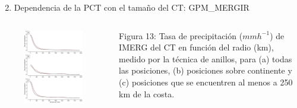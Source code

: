 \begin{frame}
\begin{enumerate}
\setcounter{enumi}{1}
    \item Dependencia de la PCT con el tamaño del CT: GPM\_MERGIR
\end{enumerate}
    \begin{columns}
        \begin{column}{0.6\textwidth}
        \begin{figure}
            \centering
            \includegraphics[scale = 0.215]{Images/Figures/Fig_3_16.jpeg}
            \caption{}
            \label{fig:fig_rbp}
        \end{figure}
        \end{column}
        
        \begin{column}{0.4\textwidth}
            \begin{block}{Figura 13:}
                Tasa de precipitación ($mm h^{-1}$) de IMERG del CT en función del radio (km), medido por la técnica de anillos, para (a) todas las posiciones, (b) posiciones sobre continente y (c) posiciones que se encuentren al menos a 250 km de la costa.
            \end{block}
        \end{column}
    \end{columns}
\end{frame}

